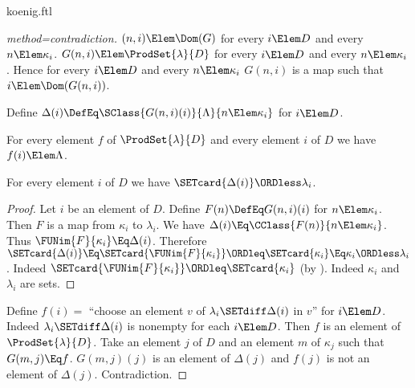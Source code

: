 \documentclass{stex}
\begin{document}
\begin{smodule}{koenig.ftl}
\begin{forthel}
\begin{proof}[method=contradiction]
    $(n,i) \Elem \Dom(G)$ for every $i \Elem D$ and every $n \Elem \kappa_{i}$.
    $G(n,i) \Elem \ProdSet{\lambda}{D}$ for every $i \Elem D$ and every $n \Elem \kappa_{i}$.
    Hence for every $i \Elem D$ and every $n \Elem \kappa_{i}$ $G(n,i)$ is a map such that $i \Elem \Dom(G(n,i))$.

    Define $\Delta(i) \DefEq \SClass{G(n,i)(i)}{\Lambda}{n \Elem \kappa_{i}}$ for $i \Elem D$.

    For every element $f$ of $\ProdSet{\lambda}{D}$ and every element $i$ of $D$ we have $f(i) \Elem \Lambda$.

    For every element $i$ of $D$ we have $\SETcard{\Delta(i)} \ORDless \lambda_{i}$.
    \begin{proof}
      Let $i$ be an element of $D$.
      Define $F(n) \DefEq G(n,i)(i)$ for $n \Elem \kappa_{i}$.
      Then $F$ is a map from $\kappa_{i}$ to $\lambda_{i}$.
      We have $\Delta(i) \Eq \CClass{F(n)}{n \Elem \kappa_{i}}$.
      Thus $\FUNim{F}{\kappa_{i}} \Eq \Delta(i)$.
      Therefore $\SETcard{\Delta(i)}
        \Eq \SETcard{\FUNim{F}{\kappa_{i}}}
        \ORDleq \SETcard{\kappa_{i}}
        \Eq \kappa_{i}
        \ORDless \lambda_{i}$.
      Indeed $\SETcard{\FUNim{F}{\kappa_{i}}} \ORDleq \SETcard{\kappa_{i}}$ (by ).
      Indeed $\kappa_{i}$ and $\lambda_{i}$ are sets.
    \end{proof}

    Define $f(i) =$ ``choose an element $v$ of $\lambda_{i} \SETdiff \Delta(i)$ in $v$'' for $i \Elem D$.
    Indeed $\lambda_{i} \SETdiff \Delta(i)$ is nonempty for each $i \Elem D$.
    Then $f$ is an element of $\ProdSet{\lambda}{D}$.
    Take an element $j$ of $D$ and an element $m$ of $\kappa_{j}$ such that $G(m,j) \Eq f$.
    $G(m,j)(j)$ is an element of $\Delta(j)$ and $f(j)$ is not an element of $\Delta(j)$.
    Contradiction.
  \end{proof}
\end{forthel}

\printbibliography
{}
\end{smodule}
\end{document}
